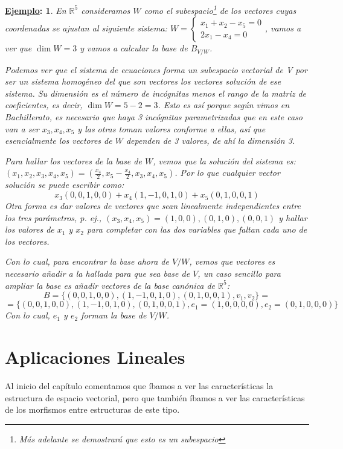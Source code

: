 \documentclass[10pt,a4paper,openright]{book}
\theoremstyle{break}
\newtheorem*{ej}{\underline{Ejemplo}:}
\begin{document}
\begin{ej}
En $\mathbb R^5$ consideramos $W$ como el subespacio\footnote{Más adelante se demostrará que esto es un subespacio} de los vectores cuyas coordenadas se ajustan al siguiente sistema: $W=\begin{cases}
x_1+x_2-x_5=0 \\
2x_1-x_4=0
\end{cases}$, vamos a ver que $\dim W=3$ y vamos a calcular la base de $B_{V/W}$.

Podemos ver que el sistema de ecuaciones forma un subespacio vectorial de V por ser un sistema homogéneo del que son vectores los vectores solución de ese sistema. Su dimensión es el número de incógnitas menos el rango de la matriz de coeficientes, es decir, $\dim W=5-2=3$. Esto es así porque según vimos en Bachillerato, es necesario que haya 3 incógnitas parametrizadas que en este caso van a ser $x_3, x_4, x_5$ y las otras toman valores conforme a ellas, así que esencialmente los vectores de $W$ dependen de 3 valores, de ahí la dimensión 3.

Para hallar los vectores de la base de $W$, vemos que la solución del sistema es: $(x_1,x_2,x_3,x_4,x_5)=(\frac{x_4}{2}, x_5-\frac{x_4}{2},x_3,x_4,x_5)$. Por lo que cualquier vector solución se puede escribir como:
$$x_3(0,0,1,0,0)+x_4(1,-1,0,1,0)+x_5(0,1,0,0,1)$$
Otra forma es dar valores de vectores que sean linealmente independientes entre los tres parámetros, p. ej., $(x_3,x_4,x_5)=(1,0,0),(0,1,0), (0,0,1)$ y hallar los valores de $x_1$ y $x_2$ para completar con las dos variables que faltan cada uno de los vectores.\par
Con lo cual, para encontrar la base ahora de $V/W$, vemos que  vectores es necesario añadir a la hallada para que sea base de $V$, un caso sencillo para ampliar la base es añadir vectores de la base canónica de $\mathbb R^5$:
$$B=\{(0,0,1,0,0),(1,-1,0,1,0),(0,1,0,0,1), v_1, v_2\}=$$
$$=\{(0,0,1,0,0),(1,-1,0,1,0),(0,1,0,0,1), e_1=(1,0,0,0,0), e_2=(0,1,0,0,0)\}$$
Con lo cual, $e_1$ y $e_2$ forman la base de $V/W$.
\end{ej}

\section{Aplicaciones Lineales}
Al inicio del capítulo comentamos que íbamos a ver las características la estructura de espacio vectorial, pero que también íbamos a ver las características de los morfismos entre estructuras de este tipo.
\end{document}
